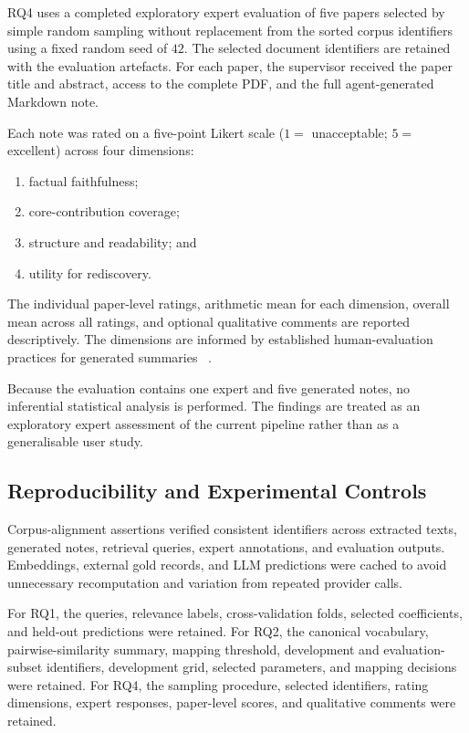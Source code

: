 \documentclass[runningheads]{llncs}
\begin{document}
RQ4 uses a completed exploratory expert evaluation of five papers
selected by simple random sampling without replacement from the sorted
corpus identifiers using a fixed random seed of \(42\). The selected
document identifiers are retained with the evaluation artefacts. For each paper, the supervisor received the paper
title and abstract, access to the complete PDF, and the full
agent-generated Markdown note.

Each note was rated on a five-point Likert scale
(\(1=\) unacceptable; \(5=\) excellent) across four dimensions:

\begin{enumerate}
    \item factual faithfulness;
    \item core-contribution coverage;
    \item structure and readability; and
    \item utility for rediscovery.
\end{enumerate}

The individual paper-level ratings, arithmetic mean for each dimension,
overall mean across all ratings, and optional qualitative comments are
reported descriptively. The dimensions are informed by established
human-evaluation practices for generated summaries
~\cite{fabbri2021summeval}.

Because the evaluation contains one expert and five generated notes, no
inferential statistical analysis is performed. The findings are treated
as an exploratory expert assessment of the current pipeline rather than
as a generalisable user study.

\subsection{Reproducibility and Experimental Controls}
\label{sec:reproducibility}

Corpus-alignment assertions verified consistent identifiers across
extracted texts, generated notes, retrieval queries, expert annotations,
and evaluation outputs. Embeddings, external gold records, and LLM
predictions were cached to avoid unnecessary recomputation and variation
from repeated provider calls.

For RQ1, the queries, relevance labels, cross-validation folds, selected
coefficients, and held-out predictions were retained. For RQ2, the
canonical vocabulary, pairwise-similarity summary, mapping threshold,
development and evaluation-subset identifiers, development grid, selected parameters,
and mapping decisions were retained. For RQ4, the sampling procedure,
selected identifiers, rating dimensions, expert responses, paper-level
scores, and qualitative comments were retained.
\end{document}
